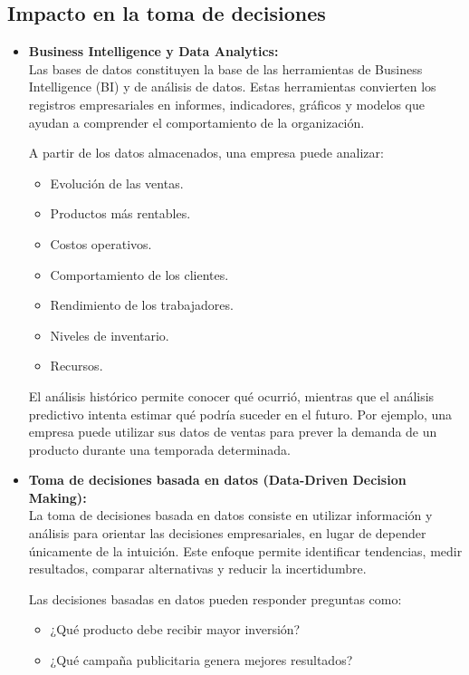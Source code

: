 \documentclass[12pt,a4paper]{article}
\begin{document}
\subsection{Impacto en la toma de decisiones}

\begin{itemize}
  \item \textbf{Business Intelligence y Data Analytics:} \\
  Las bases de datos constituyen la base de las herramientas de Business Intelligence (BI) y de análisis de datos. Estas herramientas convierten los registros empresariales en informes, indicadores, gráficos y modelos que ayudan a comprender el comportamiento de la organización.

  A partir de los datos almacenados, una empresa puede analizar:
  \begin{itemize}
    \item Evolución de las ventas.
    \item Productos más rentables.
    \item Costos operativos.
    \item Comportamiento de los clientes.
    \item Rendimiento de los trabajadores.
    \item Niveles de inventario.
    \item Recursos.
  \end{itemize}

  El análisis histórico permite conocer qué ocurrió, mientras que el análisis predictivo intenta estimar qué podría suceder en el futuro. Por ejemplo, una empresa puede utilizar sus datos de ventas para prever la demanda de un producto durante una temporada determinada.

  \item \textbf{Toma de decisiones basada en datos (Data-Driven Decision Making):} \\
  La toma de decisiones basada en datos consiste en utilizar información y análisis para orientar las decisiones empresariales, en lugar de depender únicamente de la intuición. Este enfoque permite identificar tendencias, medir resultados, comparar alternativas y reducir la incertidumbre.

  Las decisiones basadas en datos pueden responder preguntas como:
  \begin{itemize}
    \item ¿Qué producto debe recibir mayor inversión?
    \item ¿Qué campaña publicitaria genera mejores resultados?
  \end{itemize}


\end{itemize}
\end{document}
